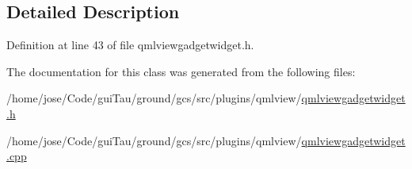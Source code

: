 \subsection{Detailed Description}


Definition at line 43 of file qmlviewgadgetwidget.\-h.



The documentation for this class was generated from the following files\-:\begin{DoxyCompactItemize}
\item 
/home/jose/\-Code/gui\-Tau/ground/gcs/src/plugins/qmlview/\hyperlink{qmlviewgadgetwidget_8h}{qmlviewgadgetwidget.\-h}\item 
/home/jose/\-Code/gui\-Tau/ground/gcs/src/plugins/qmlview/\hyperlink{qmlviewgadgetwidget_8cpp}{qmlviewgadgetwidget.\-cpp}\end{DoxyCompactItemize}
